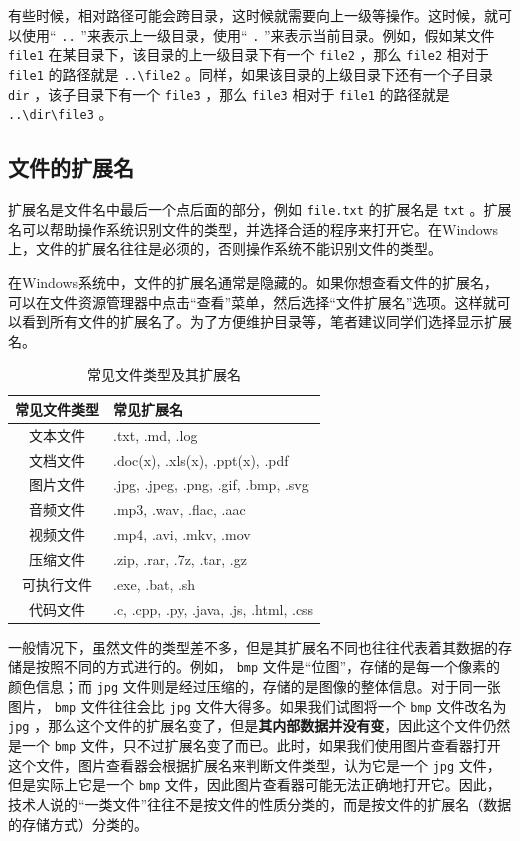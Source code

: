 有些时候，相对路径可能会跨目录，这时候就需要向上一级等操作。这时候，就可以使用“ \texttt{..} ”来表示上一级目录，使用“ \texttt{.} ”来表示当前目录。例如，假如某文件 \texttt{file1} 在某目录下，该目录的上一级目录下有一个 \texttt{file2} ，那么 \texttt{file2} 相对于 \texttt{file1} 的路径就是 \texttt{..\textbackslash file2} 。同样，如果该目录的上级目录下还有一个子目录 \texttt{dir} ，该子目录下有一个 \texttt{file3} ，那么 \texttt{file3} 相对于 \texttt{file1} 的路径就是 \texttt{..\textbackslash dir\textbackslash file3} 。

\subsection{文件的扩展名}

扩展名是文件名中最后一个点后面的部分，例如 \texttt{file.txt} 的扩展名是 \texttt{txt} 。扩展名可以帮助操作系统识别文件的类型，并选择合适的程序来打开它。在Windows上，文件的扩展名往往是必须的，否则操作系统不能识别文件的类型。

在Windows系统中，文件的扩展名通常是隐藏的。如果你想查看文件的扩展名，可以在文件资源管理器中点击“查看”菜单，然后选择“文件扩展名”选项。这样就可以看到所有文件的扩展名了。为了方便维护目录等，笔者建议同学们选择显示扩展名。

\begin{table}[ht]
  \centering
  \begin{tabular}{c|l}
    \toprule
    常见文件类型 & 常见扩展名 \\
    \midrule
    文本文件 & .txt, .md, .log \\
    文档文件 & .doc(x), .xls(x), .ppt(x), .pdf \\
    图片文件 & .jpg, .jpeg, .png, .gif, .bmp, .svg \\
    音频文件 & .mp3, .wav, .flac, .aac \\
    视频文件 & .mp4, .avi, .mkv, .mov \\
    压缩文件 & .zip, .rar, .7z, .tar, .gz \\
    可执行文件 & .exe, .bat, .sh \\
    代码文件 & .c, .cpp, .py, .java, .js, .html, .css \\
    \bottomrule
  \end{tabular}
  \caption{常见文件类型及其扩展名}
  \label{tab:file-extensions}
\end{table}

一般情况下，虽然文件的类型差不多，但是其扩展名不同也往往代表着其数据的存储是按照不同的方式进行的。例如， \texttt{bmp} 文件是“位图”，存储的是每一个像素的颜色信息；而 \texttt{jpg} 文件则是经过压缩的，存储的是图像的整体信息。对于同一张图片， \texttt{bmp} 文件往往会比 \texttt{jpg} 文件大得多。如果我们试图将一个 \texttt{bmp} 文件改名为 \texttt{jpg} ，那么这个文件的扩展名变了，但是\textbf{其内部数据并没有变}，因此这个文件仍然是一个 \texttt{bmp} 文件，只不过扩展名变了而已。此时，如果我们使用图片查看器打开这个文件，图片查看器会根据扩展名来判断文件类型，认为它是一个 \texttt{jpg} 文件，但是实际上它是一个 \texttt{bmp} 文件，因此图片查看器可能无法正确地打开它。因此，技术人说的“一类文件”往往不是按文件的性质分类的，而是按文件的扩展名（数据的存储方式）分类的。

